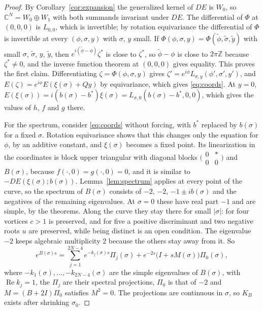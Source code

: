 \documentclass[11pt]{article}
\theoremstyle{definition}
\newcommand{\re}{\operatorname{Re}}
\newcommand{\C}{\mathbb{C}}
\begin{document}
\begin{proof}
By Corollary~\ref{cor:expansion} the generalized kernel of $DE$ is $W_0$, so $\C^N = W_0 \oplus W_1$ with both summands invariant under $DE$. The differential of $\Phi$ at $(0, 0, 0)$ is $L_{0,0}$, which is invertible; by rotation equivariance the differential of $\Phi$ is invertible at every $(\phi, \sigma, y)$ with $\sigma$, $y$ small. If $\Phi(\phi, \sigma, y) = \Phi(\tilde\phi, \tilde\sigma, \tilde y)$ with small $\sigma$, $\tilde\sigma$, $y$, $\tilde y$, then $e^{i(\tilde\phi - \phi)}\zeta^*$ is close to $\zeta^*$, so $\tilde\phi - \phi$ is close to $2\pi\mathbb Z$ because $\zeta^* \ne 0$, and the inverse function theorem at $(0, 0, 0)$ gives equality. This proves the first claim. Differentiating $\zeta = \Phi(\phi, \sigma, y)$ gives $\zeta' = e^{i\phi}L_{\sigma,y}(\phi', \sigma', y')$, and $E(\zeta) = e^{i\phi}E(\xi(\sigma) + Qy)$ by equivariance, which gives \eqref{eq:coords}. At $y = 0$, $E(\xi(\sigma)) = i(b(\sigma) - b^*)\xi(\sigma) = L_{\sigma, 0}(b(\sigma) - b^*, 0, 0)$, which gives the values of $h$, $f$ and $g$ there.

For the spectrum, consider \eqref{eq:coords} without forcing, with $b^*$ replaced by $b(\sigma)$ for a fixed $\sigma$. Rotation equivariance shows that this changes only the equation for $\phi$, by an additive constant, and $\xi(\sigma)$ becomes a fixed point. Its linearization in the coordinates is block upper triangular with diagonal blocks $\bigl(\begin{smallmatrix}0 & *\\ 0 & 0\end{smallmatrix}\bigr)$ and $B(\sigma)$, because $f(\cdot, 0) = g(\cdot, 0) = 0$, and it is similar to $-DE(\xi(\sigma); b(\sigma))$. Lemma~\ref{lem:spectrum} applies at every point of the curve, so the spectrum of $B(\sigma)$ consists of $-2$, $-2$, $-1 \pm ib(\sigma)$ and the negatives of the remaining eigenvalues. At $\sigma = 0$ these have real part $-1$ and are simple, by the theorems. Along the curve they stay there for small $|\sigma|$: for four vortices $c > 1$ is preserved, and for five a positive discriminant and two negative roots $u$ are preserved, while being distinct is an open condition. The eigenvalue $-2$ keeps algebraic multiplicity $2$ because the others stay away from it. So
\[
  e^{B(\sigma)s} = \sum_{j=1}^{2N-4}e^{-k_j(\sigma)s}\Pi_j(\sigma) + e^{-2s}\bigl(I + sM(\sigma)\bigr)\Pi_0(\sigma),
\]
where $-k_1(\sigma), \ldots, -k_{2N-4}(\sigma)$ are the simple eigenvalues of $B(\sigma)$, with $\re k_j = 1$, the $\Pi_j$ are their spectral projections, $\Pi_0$ is that of $-2$ and $M = (B + 2I)\Pi_0$ satisfies $M^2 = 0$. The projections are continuous in $\sigma$, so $K_B$ exists after shrinking $\sigma_0$.
\end{proof}
\end{document}
